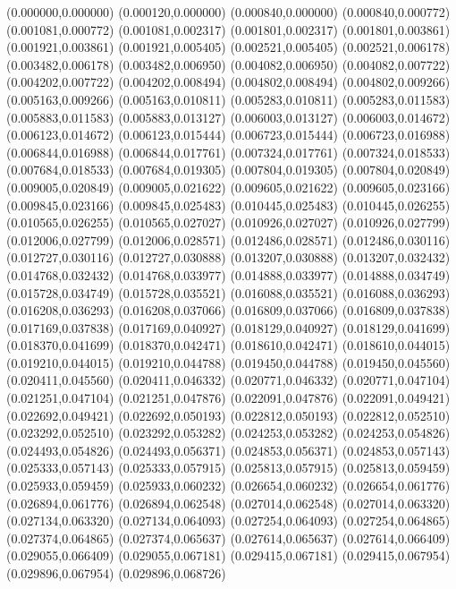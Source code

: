 (0.000000,0.000000)
(0.000120,0.000000)
(0.000840,0.000000)
(0.000840,0.000772)
(0.001081,0.000772)
(0.001081,0.002317)
(0.001801,0.002317)
(0.001801,0.003861)
(0.001921,0.003861)
(0.001921,0.005405)
(0.002521,0.005405)
(0.002521,0.006178)
(0.003482,0.006178)
(0.003482,0.006950)
(0.004082,0.006950)
(0.004082,0.007722)
(0.004202,0.007722)
(0.004202,0.008494)
(0.004802,0.008494)
(0.004802,0.009266)
(0.005163,0.009266)
(0.005163,0.010811)
(0.005283,0.010811)
(0.005283,0.011583)
(0.005883,0.011583)
(0.005883,0.013127)
(0.006003,0.013127)
(0.006003,0.014672)
(0.006123,0.014672)
(0.006123,0.015444)
(0.006723,0.015444)
(0.006723,0.016988)
(0.006844,0.016988)
(0.006844,0.017761)
(0.007324,0.017761)
(0.007324,0.018533)
(0.007684,0.018533)
(0.007684,0.019305)
(0.007804,0.019305)
(0.007804,0.020849)
(0.009005,0.020849)
(0.009005,0.021622)
(0.009605,0.021622)
(0.009605,0.023166)
(0.009845,0.023166)
(0.009845,0.025483)
(0.010445,0.025483)
(0.010445,0.026255)
(0.010565,0.026255)
(0.010565,0.027027)
(0.010926,0.027027)
(0.010926,0.027799)
(0.012006,0.027799)
(0.012006,0.028571)
(0.012486,0.028571)
(0.012486,0.030116)
(0.012727,0.030116)
(0.012727,0.030888)
(0.013207,0.030888)
(0.013207,0.032432)
(0.014768,0.032432)
(0.014768,0.033977)
(0.014888,0.033977)
(0.014888,0.034749)
(0.015728,0.034749)
(0.015728,0.035521)
(0.016088,0.035521)
(0.016088,0.036293)
(0.016208,0.036293)
(0.016208,0.037066)
(0.016809,0.037066)
(0.016809,0.037838)
(0.017169,0.037838)
(0.017169,0.040927)
(0.018129,0.040927)
(0.018129,0.041699)
(0.018370,0.041699)
(0.018370,0.042471)
(0.018610,0.042471)
(0.018610,0.044015)
(0.019210,0.044015)
(0.019210,0.044788)
(0.019450,0.044788)
(0.019450,0.045560)
(0.020411,0.045560)
(0.020411,0.046332)
(0.020771,0.046332)
(0.020771,0.047104)
(0.021251,0.047104)
(0.021251,0.047876)
(0.022091,0.047876)
(0.022091,0.049421)
(0.022692,0.049421)
(0.022692,0.050193)
(0.022812,0.050193)
(0.022812,0.052510)
(0.023292,0.052510)
(0.023292,0.053282)
(0.024253,0.053282)
(0.024253,0.054826)
(0.024493,0.054826)
(0.024493,0.056371)
(0.024853,0.056371)
(0.024853,0.057143)
(0.025333,0.057143)
(0.025333,0.057915)
(0.025813,0.057915)
(0.025813,0.059459)
(0.025933,0.059459)
(0.025933,0.060232)
(0.026654,0.060232)
(0.026654,0.061776)
(0.026894,0.061776)
(0.026894,0.062548)
(0.027014,0.062548)
(0.027014,0.063320)
(0.027134,0.063320)
(0.027134,0.064093)
(0.027254,0.064093)
(0.027254,0.064865)
(0.027374,0.064865)
(0.027374,0.065637)
(0.027614,0.065637)
(0.027614,0.066409)
(0.029055,0.066409)
(0.029055,0.067181)
(0.029415,0.067181)
(0.029415,0.067954)
(0.029896,0.067954)
(0.029896,0.068726)
